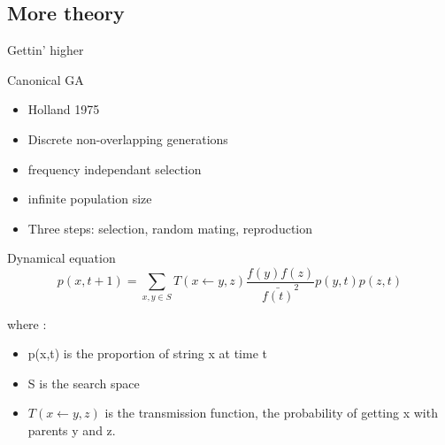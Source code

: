 \subsection{More theory}
\begin{frame}{Gettin' higher}
  \begin{block}{Canonical GA}
    \begin{itemize}
    \item Holland 1975
    \item Discrete non-overlapping generations
    \item frequency independant selection
    \item infinite population size
    \item Three steps: selection, random mating, reproduction
    \end{itemize}
  \end{block}

  \begin{block}{Dynamical equation}
    $$p(x,t+1) = \sum\limits_{x,y \in S} T(x \leftarrow y,z)
    \frac{f(y)f(z)}{\bar{f(t)}^2}p(y,t)p(z, t)$$

    where : 
    \begin{itemize}
      \item p(x,t) is the proportion of string x at time t
      \item S is the search space
      \item $T(x \leftarrow y,z)$ is the transmission function, the probability of getting x with parents y and z.
    \end{itemize}
  \end{block}
\end{frame}

